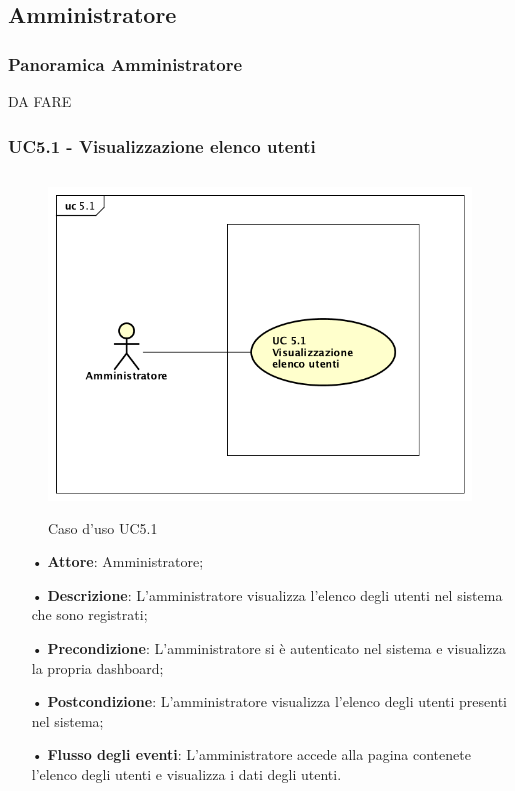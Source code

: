 \subsection{Amministratore}
\subsubsection{Panoramica Amministratore}
DA FARE


\subsubsection{UC5.1 - Visualizzazione elenco utenti}

\begin{figure}[H]
\centering
\includegraphics[height=9cm, width=17cm]{img/UC51.png} 
\caption{Caso d'uso UC5.1}
\end{figure}


\begin{itemize}
\item[•] \textbf{Attore}: Amministratore;

\item[•] \textbf{Descrizione}: L'amministratore visualizza l'elenco degli utenti nel sistema che sono registrati;

\item[•] \textbf{Precondizione}: L'amministratore si è autenticato nel sistema e visualizza la propria dashboard;

\item[•] \textbf{Postcondizione}: L'amministratore visualizza l'elenco degli utenti presenti nel sistema;

\item[•] \textbf{Flusso degli eventi}: L'amministratore accede alla pagina contenete l'elenco degli utenti e visualizza i dati degli utenti. 
\end{itemize}

